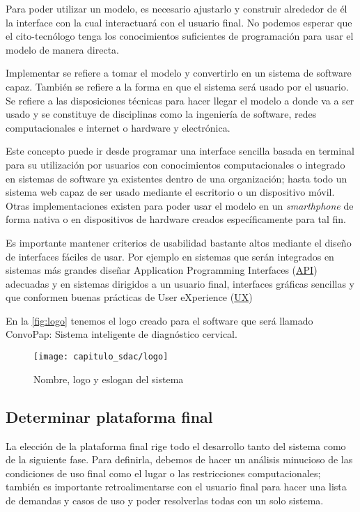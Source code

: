 Para poder utilizar un modelo, es necesario ajustarlo y construir alrededor de
él la interface con la cual interactuará con el usuario final. No podemos
esperar que el cito-tecnólogo tenga los conocimientos suficientes de
programación para usar el modelo de manera directa.

Implementar se refiere a tomar el modelo y convertirlo en un sistema de software
capaz. También se refiere a la forma en que el sistema será usado por el
usuario. Se refiere a las disposiciones técnicas para hacer llegar el modelo
a donde va a ser usado y se constituye de disciplinas como la ingeniería de software,
redes computacionales e internet o hardware y electrónica. 

Este concepto puede ir desde programar una interface sencilla basada en terminal
para su utilización por usuarios con conocimientos computacionales o integrado
en sistemas de software ya existentes dentro de una organización; hasta todo un
sistema web capaz de ser usado mediante el escritorio o un dispositivo móvil.
Otras implementaciones existen para poder usar el modelo en un
\emph{smarthphone} de forma nativa o en dispositivos de hardware creados
específicamente para tal fin.

Es importante mantener criterios de usabilidad bastante altos mediante el diseño
de interfaces fáciles de usar. Por ejemplo en sistemas que serán integrados en
sistemas más grandes diseñar Application Programming Interfaces
(\hyperlink{abbr}{API})
adecuadas y en sistemas dirigidos a un usuario final, interfaces gráficas
sencillas y que conformen buenas prácticas de User eXperience
(\hyperlink{abbr}{UX})

En la \autoref{fig:logo} tenemos el logo creado para el software que será
llamado ConvoPap: Sistema inteligente de diagnóstico cervical.

\begin{figure}[H]
    \centering
    \texttt{[image: capitulo\_sdac/logo]}
    \caption{Nombre, logo y eslogan del sistema}\label{fig:logo}
\end{figure}

\subsection{Determinar plataforma final}
La elección de la plataforma final rige todo el desarrollo tanto del sistema
como de la siguiente fase. Para definirla, debemos de hacer un análisis
minucioso de las condiciones de uso final como el lugar o las restricciones
computacionales; también es importante retroalimentarse con el usuario final
para hacer una lista de demandas y casos de uso y poder resolverlas todas con un
solo sistema.


